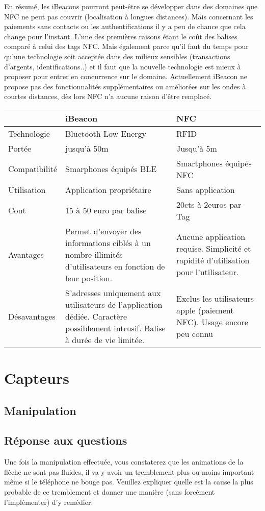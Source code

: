 \documentclass[francais,12pt]{article}
\begin{document}
		En résumé, les iBeacons pourront peut-être se développer dans des domaines que NFC ne peut pas couvrir (localisation à longues distances). Mais concernant les paiements sans contacts ou les authentifications il y a peu de chance que cela change pour l'instant.
		L’une des premières raisons étant le coût des balises comparé à celui des tags NFC. Mais également parce qu’il faut du temps pour qu’une technologie soit acceptée dans des milieux sensibles (transactions d’argents, identifications..) et il faut que la nouvelle technologie est mieux à proposer pour entrer en concurrence sur le domaine. Actuellement iBeacon ne propose pas des fonctionnalités supplémentaires ou améliorées sur les ondes à courtes distances, dès lors NFC n’a aucune raison d’être remplacé.
	
	
		\begin{tabular}{|l|p{6cm}|p{6cm}|}
		\hline 
		\rowcolor{lightgray}& iBeacon & NFC \\ 
		\hline 
		Technologie & Bluetooth Low Energy  & RFID  \\ 
		\hline 
		Portée & jusqu'à 50m  & Jusqu'à 5m \\ 
		\hline 
		Compatibilité & Smarphones équipés BLE  & Smartphones équipés NFC  \\ 
		\hline 
		Utilisation & Application propriétaire & Sans application \\ 
		\hline 
		Cout &  15 à 50 euro par balise & 20cts à 2euros par Tag \\ 
		\hline 
		Avantages & Permet d'envoyer des informations ciblés à un nombre illimités d'utilisateurs en fonction de leur position.  & Aucune application requise. Simplicité et rapidité d'utilisation pour l'utilisateur. \\ 
		\hline 
		Désavantages & S'adresses uniquement aux utilisateurs de l'application dédiée. Caractère possiblement intrusif. Balise à durée de vie limitée. & Exclus les utilisateurs apple (paiement NFC). Usage encore peu connu \\ 
		\hline 
	\end{tabular} 
	
	\section*{Capteurs}
	\subsection*{Manipulation}
	\subsection*{Réponse aux questions}
	Une fois la manipulation effectuée, vous constaterez que les animations de la flèche ne sont pas fluides, il va y avoir un tremblement plus ou moins important même si le téléphone ne bouge pas. Veuillez expliquer quelle est la cause la plus probable de ce tremblement et donner une manière (sans forcément l’implémenter) d’y remédier. 
	
\end{document}
